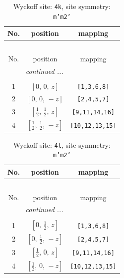 \documentclass[fleqn,8pt]{jsarticle}
\begin{document}
\renewcommand{\arraystretch}{1.2}
\begin{longtable}{ccc}
\caption{Wyckoff site: {\tt 4k}, site symmetry: {\tt m'm2'}}
 \\
 \hline \hline
No. & position & mapping \\ \hline \endfirsthead

\multicolumn{2}{l}{\tablename\ \thetable{}} \\
 \hline \hline
No. & position & mapping \\ \hline \endhead

 \hline \hline
\multicolumn{2}{r}{\footnotesize\it continued ...} \\ \endfoot

 \hline \hline
\multicolumn{2}{r}{} \\ \endlastfoot

1 & $\left[ 0,\, 0,\, z \right]$ & {\tt [1,3,6,8]} \\ \hline
2 & $\left[ 0,\, 0,\, - z \right]$ & {\tt [2,4,5,7]} \\ \hline
3 & $\left[ \frac{1}{2},\, \frac{1}{2},\, z \right]$ & {\tt [9,11,14,16]} \\ \hline
4 & $\left[ \frac{1}{2},\, \frac{1}{2},\, - z \right]$ & {\tt [10,12,13,15]} \\
\end{longtable}
\renewcommand{\arraystretch}{1.2}
\begin{longtable}{ccc}
\caption{Wyckoff site: {\tt 4l}, site symmetry: {\tt m'm2'}}
 \\
 \hline \hline
No. & position & mapping \\ \hline \endfirsthead

\multicolumn{2}{l}{\tablename\ \thetable{}} \\
 \hline \hline
No. & position & mapping \\ \hline \endhead

 \hline \hline
\multicolumn{2}{r}{\footnotesize\it continued ...} \\ \endfoot

 \hline \hline
\multicolumn{2}{r}{} \\ \endlastfoot

1 & $\left[ 0,\, \frac{1}{2},\, z \right]$ & {\tt [1,3,6,8]} \\ \hline
2 & $\left[ 0,\, \frac{1}{2},\, - z \right]$ & {\tt [2,4,5,7]} \\ \hline
3 & $\left[ \frac{1}{2},\, 0,\, z \right]$ & {\tt [9,11,14,16]} \\ \hline
4 & $\left[ \frac{1}{2},\, 0,\, - z \right]$ & {\tt [10,12,13,15]} \\
\end{longtable}
\end{document}
